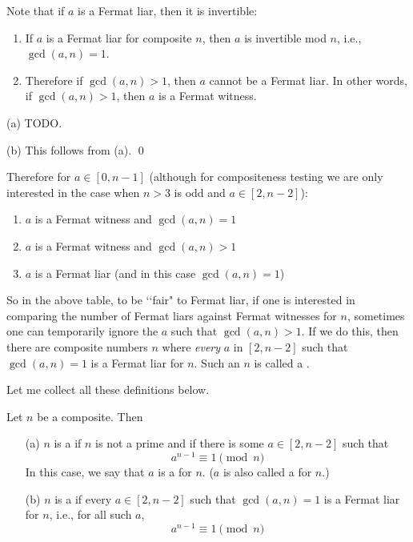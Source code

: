 Note that if $a$ is a Fermat liar, then it is invertible:

\begin{prop}
  \mbox{}
  \begin{enumerate}[nosep,label=\textnormal{(\alph*)}]
    \item
      If $a$ is a Fermat liar for composite $n$,
      then $a$ is invertible mod $n$, i.e., $\gcd(a, n) = 1$.
    \item
      Therefore if $\gcd(a, n) > 1$, then $a$ cannot be a Fermat liar.
      In other words, if $\gcd(a, n) > 1$, then $a$ is a Fermat witness.
  \end{enumerate}
\end{prop}
\proof
(a)
TODO.

(b) This follows from (a).
\qed

Therefore for $a \in [0, n-1]$ (although for compositeness testing
we are only interested in the case when $n > 3$ is odd and $a \in [2, n-2]$):
\begin{enumerate}
  \item $a$ is a Fermat witness and $\gcd(a, n) = 1$
  \item $a$ is a Fermat witness and $\gcd(a, n) > 1$
  \item $a$ is a Fermat liar (and in this case $\gcd(a, n) = 1$)
\end{enumerate}
So in the above table, to be \lq\lq fair" to Fermat liar,
if one is interested in comparing the number of
Fermat liars against Fermat witnesses for $n$,
sometimes one can temporarily ignore the $a$ such that
$\gcd(a, n) > 1$.
If we do this, then
there are composite numbers $n$ where \textit{every} $a$ in $[2, n-2]$
such that $\gcd(a, n) = 1$ is a Fermat liar for $n$.
Such an $n$ is called a .

Let me collect all these definitions below.

\begin{defn}
  Let $n$ be a composite.
  Then
  \begin{enumerate}[nosep]
  \item[(a)] $n$ is a
    if $n$ is not a prime and 
    if there is some $a \in [2, n-2]$ such that 
    \[
    a^{n-1} \equiv 1 \pmod{n}
    \]
    In this case, we say that $a$ is a
     for $n$.
    ($a$ is also called a  for $n$.)
  \item[(b)] $n$ is a 
    if every $a \in [2, n-2]$ such that $\gcd(a, n) = 1$
    is a Fermat liar for $n$, i.e., for all such $a$,
    \[
    a^{n-1} \equiv 1 \pmod{n}
    \]
  \end{enumerate}
\end{defn}

